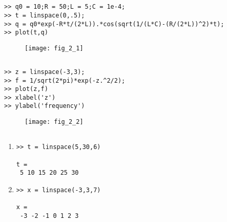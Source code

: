 \documentclass[../main.tex]{subfiles}
\begin{document}
\chapter{}
\label{cha:cha_2}


\section{}

\begin{lstlisting}[numbers=none]
>> q0 = 10;R = 50;L = 5;C = 1e-4;
>> t = linspace(0,.5);
>> q = q0*exp(-R*t/(2*L)).*cos(sqrt(1/(L*C)-(R/(2*L))^2)*t);
>> plot(t,q) 
\end{lstlisting}

\begin{figure}[H]
		\texttt{[image: fig\_2\_1]}
		\label{fig:fig_2_1}
	\end{figure}

\section{}
\begin{lstlisting}[numbers=none]
>> z = linspace(-3,3);
>> f = 1/sqrt(2*pi)*exp(-z.^2/2);
>> plot(z,f)
>> xlabel('z')
>> ylabel('frequency')
\end{lstlisting}

\begin{figure}[H]
		\texttt{[image: fig\_2\_2]}
		\label{fig:fig_2_ 2}
	\end{figure}
\section{}
\begin{enumerate}[label=\bfseries(\alph*)]
\item 
\begin{lstlisting}[numbers=none]
>> t = linspace(5,30,6) 

t =
 5 10 15 20 25 30 
\end{lstlisting}

\item

\begin{lstlisting}[numbers=none]
>> x = linspace(-3,3,7)

x =
 -3 -2 -1 0 1 2 3 
\end{lstlisting}
\end{enumerate}
\end{document}

